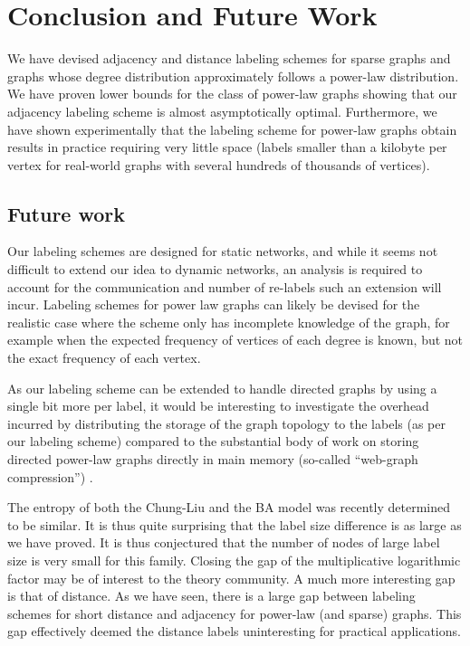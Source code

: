 \section{Conclusion and Future Work}

We have devised adjacency and distance labeling schemes for sparse graphs and graphs whose degree distribution approximately follows a power-law distribution.
 We have proven lower bounds for the class of power-law graphs showing that our adjacency labeling scheme is  almost asymptotically optimal. 
 Furthermore, we have shown experimentally that the labeling scheme for power-law graphs obtain
results in practice requiring very little space (labels smaller than a kilobyte per vertex for real-world graphs with several hundreds of thousands of vertices).


\subsection{Future work}
Our labeling schemes are designed for static networks, and while it seems not difficult to extend our idea to dynamic networks, an analysis is required to account for the communication and number of re-labels such an extension will incur.
Labeling schemes for power law graphs can likely be devised for the realistic case where the scheme only has incomplete knowledge of the graph, for example when the expected frequency of vertices of each degree is known, but not the exact frequency of each vertex.

As our labeling scheme can be extended to handle directed graphs by using a single bit more per label, it would be interesting to investigate the overhead incurred by distributing the storage of the graph topology to the labels (as per our labeling scheme) compared to the substantial body of work on storing directed power-law graphs directly in main memory (so-called ``web-graph compression'') \cite{guillaume2002efficient,asano2003compact, asano2008efficient,claude2010fast}.

The entropy of both the Chung-Liu and the BA model was recently determined to be similar. It is thus quite surprising that the label size difference is as large as we have proved. It is thus conjectured that the number of nodes of large label size is very small for this family.
Closing the  gap of the multiplicative logarithmic factor may be  of interest to the theory community. A much more interesting gap is that of distance.
As we have seen, there is a large gap between labeling schemes for short distance and adjacency for power-law (and sparse) graphs.
This gap effectively deemed the distance labels uninteresting for practical applications.


